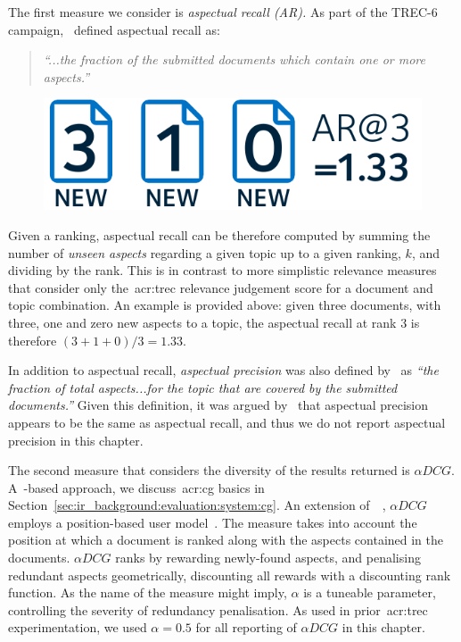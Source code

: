 The first measure we consider is \emph{aspectual recall (AR).} As part of the TREC-6 campaign,~\cite{over1998trec} defined aspectual recall as:

\begin{quote}
    \emph{``...the fraction of the submitted documents which contain one or more aspects.''}
\end{quote}

\begin{figure}
    \begin{center}
    \vspace*{-10mm}
    \includegraphics[width=1\textwidth]{figures/ch8-aspectual_recall.pdf}
    \end{center}
    \label{fig:aspectual_recall}
\end{figure}

Given a ranking, aspectual recall can be therefore computed by summing the number of \emph{unseen aspects} regarding a given topic up to a given ranking, $k$, and dividing by the rank. This is in contrast to more simplistic relevance measures that consider only the~\gls{acr:trec} relevance judgement score for a document and topic combination. An example is provided above: given three documents, with three, one and zero new aspects to a topic, the aspectual recall at rank 3 is therefore $(3+1+0)/3 = 1.33$.

In addition to aspectual recall, \emph{aspectual precision} was also defined by~\cite{over2001trec} as \emph{``the fraction of total aspects...for the topic that are covered by the submitted documents.''} Given this definition, it was argued by~\cite{sanderson2010test} that aspectual precision appears to be the same as aspectual recall, and thus we do not report aspectual precision in this chapter.

The second measure that considers the diversity of the results returned is $\alpha DCG$. A~-based approach, we discuss~\gls{acr:cg} basics in Section~\ref{sec:ir_background:evaluation:system:cg}. An extension of~~\citep{jarvelin2002cg}, $\alpha DCG$ employs a position-based user model~\citep{clarke2008adcg}. The measure takes into account the position at which a document is ranked along with the aspects contained in the documents. $\alpha DCG$ ranks by rewarding newly-found aspects, and penalising redundant aspects geometrically, discounting all rewards with a discounting rank function. As the name of the measure might imply, $\alpha$ is a tuneable parameter, controlling the severity of redundancy penalisation. As used in prior~\gls{acr:trec} experimentation, we used $\alpha=0.5$ for all reporting of $\alpha DCG$ in this chapter.


